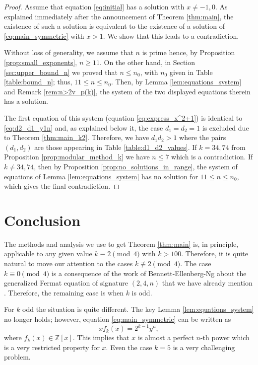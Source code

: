 \documentclass[12pt]{amsart}
\numberwithin{equation}{section}
\theoremstyle{definition}
\theoremstyle{remark}
\newcommand{\ZZ}{\mathbb{Z}}
\begin{document}
\begin{proof}
Assume that equation \eqref{eq:initial} has a solution with $x\neq -1,0$. As explained immediately after the announcement of Theorem \ref{thm:main}, the existence of such a solution is equivalent to the existence of a solution of \eqref{eq:main_symmetric} with $x>1$. We show that this leads to a contradiction.

Without loss of generality, we assume that $n$ is prime hence, by Proposition \ref{prop:small_exponents}, $n\ge 11$. On the other hand, in Section \ref{sec:upper_bound_n} we proved that $n\le n_0$, with $n_0$ given in Table \ref{table:bound_n}; thus, $11\le n\le n_0$. Then, by Lemma \ref{lem:equations_system} and Remark \ref{rem:n>2v_p(k)}, the system of the two displayed equations therein has a solution. 

The first equation of this system (equation \eqref{eq:express_x^2+1}) is identical to \eqref{eq:d2_d1_y1n} and, as explained below it, the case $d_1=d_2=1$ is excluded due to Theorem \ref{thm:main_k2}. Therefore, we have $d_1d_2>1$ where the pairs $(d_1,d_2)$ are those appearing in Table \ref{table:d1_d2_values}. If $k=34, 74$ from Proposition \ref{prop:modular_method_k} we have $n\leq 7$ which is a contradiction. If $k\neq 34, 74$, then by Proposition \ref{prop:no_solutions_in_range}, the system of equations of Lemma \ref{lem:equations_system} has no solution for $11\leq n\leq n_0$, which gives the final contradiction.
\end{proof}



\section{Conclusion}

The methods and analysis we use to get Theorem \ref{thm:main} is, in principle, applicable to any given value $k\equiv 2\pmod{4}$ with $k>100$. Therefore, it is quite natural to move our attention to the cases $k\not\equiv 2\pmod{4}$. The case $k\equiv 0\pmod{4}$ is a consequence of the work of Bennett-Ellenberg-Ng about the generalized Fermat equation of signature $(2,4, n)$ that we have already mention \cite{Ellenberg04, BennettEllenbergNg10}. Therefore, the remaining case is when $k$ is odd. 

For $k$ odd the situation is quite different. The key Lemma \ref{lem:equations_system} no longer holds; however, 
equation \eqref{eq:main_symmetric} can be written as 
\begin{equation}
    xf_k(x)=2^{k-1}y^n,
\end{equation}
where $f_k(x)\in\ZZ[x]$. This implies that $x$ is almost a perfect $n$-th power which is a very restricted property for $x$. Even the case $k=5$ is a very challenging problem.  



{}

\end{document}
